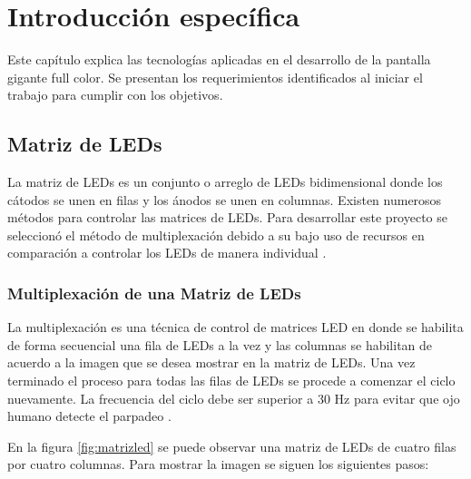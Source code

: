 \chapter{Introducción específica} %

\label{Chapter2}

Este capítulo explica las tecnologías aplicadas en el desarrollo de la pantalla gigante full color. Se presentan los requerimientos identificados al iniciar el trabajo para cumplir con los objetivos.
\section{Matriz de LEDs}
La matriz de LEDs es un conjunto o arreglo de LEDs  bidimensional donde los cátodos se unen en filas y los ánodos se unen en columnas. Existen numerosos métodos para controlar las matrices de LEDs. Para desarrollar este proyecto se seleccionó el método de multiplexación debido a su bajo uso de recursos en comparación a controlar los LEDs de manera individual \citep{CONCEPTOMATRIZ}.
\subsection{Multiplexación de una Matriz de LEDs }
La multiplexación es una técnica de control de matrices LED en donde se habilita de forma secuencial una fila de LEDs a la vez y las columnas se habilitan de acuerdo a la imagen que se desea mostrar en la matriz de LEDs. Una vez terminado el proceso para todas las filas de LEDs se procede a comenzar el ciclo nuevamente. La frecuencia del ciclo debe ser superior a 30 Hz para evitar que ojo humano detecte el parpadeo \citep{MULTIPLEXADO}.

En la figura \ref{fig:matrizled} se puede observar una matriz de LEDs de cuatro filas por cuatro columnas. Para mostrar la imagen se siguen los siguientes pasos:


